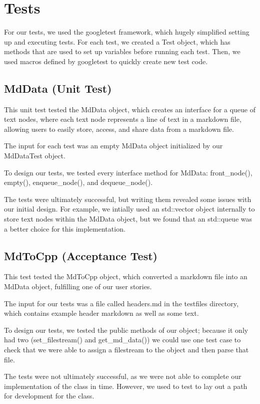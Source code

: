 \section{Tests}

For our tests, we used the googletest framework, which hugely simplified setting up and executing tests. For each test, we created a Test object, which has methods that are used to set up variables before running each test. Then, we used macros defined by googletest to quickly create new test code.

\subsection{MdData (Unit Test)}

This unit test tested the MdData object, which creates an interface for a queue of text nodes, where each text node represents a line of text in a markdown file, allowing users to easily store, access, and share data from a markdown file.

The input for each test was an empty MdData object initialized by our MdDataTest object.

To design our tests, we tested every interface method for MdData: front\_node(), empty(), enqueue\_node(), and dequeue\_node(). 

The tests were ultimately successful, but writing them revealed some issues with our initial design. For example, we intially used an std::vector object internally to store text nodes within the MdData object, but we found that an std::queue was a better choice for this implementation.

\subsection{MdToCpp (Acceptance Test)}

This test tested the MdToCpp object, which converted a markdown file into an MdData object, fulfilling one of our user stories.

The input for our tests was a file called headers.md in the testfiles directory, which contains example header markdown as well as some text.

To design our tests, we tested the public methods of our object; because it only had two (set\_filestream() and get\_md\_data()) we could use one test case to check that we were able to assign a filestream to the object and then parse that file.

The tests were not ultimately successful, as we were not able to complete our implementation of the class in time. However, we used to test to lay out a path for development for the class.

